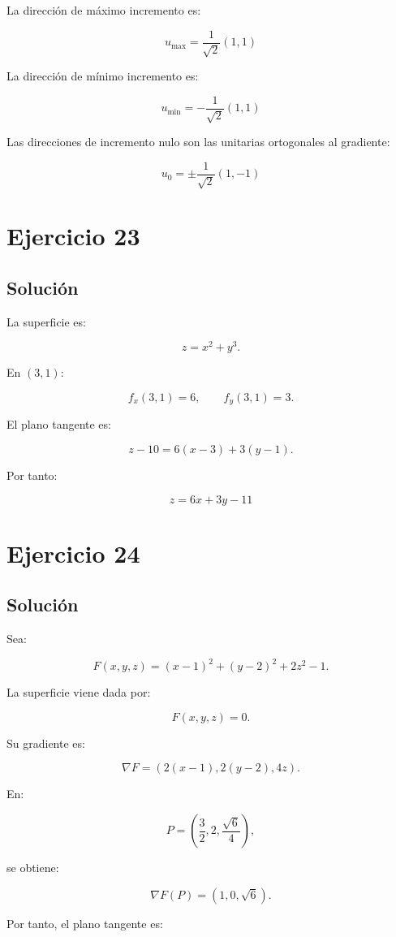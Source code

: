 \documentclass[11pt,a4paper]{article}
\begin{document}
La dirección de máximo incremento es:

\[
\boxed{
u_{\max}
=
\frac1{\sqrt2}(1,1)
}
\]

La dirección de mínimo incremento es:

\[
\boxed{
u_{\min}
=
-\frac1{\sqrt2}(1,1)
}
\]

Las direcciones de incremento nulo son las unitarias ortogonales al gradiente:

\[
\boxed{
u_0
=
\pm
\frac1{\sqrt2}(1,-1)
}
\]

\section{Ejercicio 23}
\subsection{Solución}

La superficie es:

\[
z=x^2+y^3.
\]

En \((3,1)\):

\[
f_x(3,1)=6,
\qquad
f_y(3,1)=3.
\]

El plano tangente es:

\[
z-10
=
6(x-3)
+
3(y-1).
\]

Por tanto:

\[
\boxed{
z
=
6x+3y-11
}
\]

\section{Ejercicio 24}
\subsection{Solución}

Sea:

\[
F(x,y,z)
=
(x-1)^2+(y-2)^2+2z^2-1.
\]

La superficie viene dada por:

\[
F(x,y,z)=0.
\]

Su gradiente es:

\[
\nabla F
=
\left(
2(x-1),
2(y-2),
4z
\right).
\]

En:

\[
P=
\left(
\frac32,
2,
\frac{\sqrt6}{4}
\right),
\]

se obtiene:

\[
\nabla F(P)
=
(1,0,\sqrt6).
\]

Por tanto, el plano tangente es:
\end{document}
